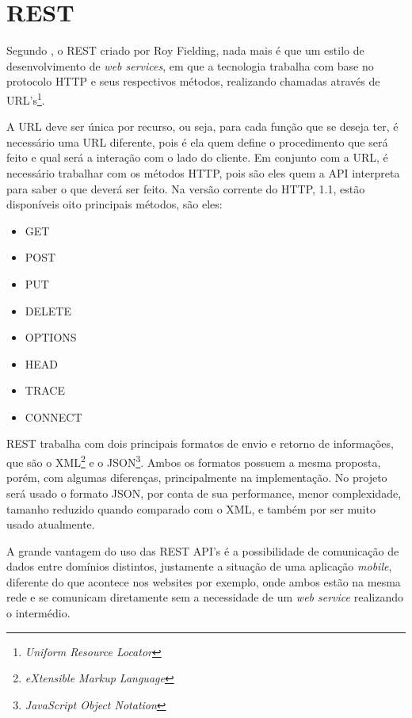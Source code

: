 \section{REST}
	\par Segundo , o REST criado por Roy Fielding, nada mais é que um estilo de desenvolvimento de \textit{web services}, em que a tecnologia trabalha com base no protocolo HTTP e seus respectivos métodos, realizando chamadas através de URL's\footnote{\textit{Uniform Resource Locator}}. 
	\par A URL deve ser única por recurso, ou seja, para cada função que se deseja ter, é necessário uma URL diferente, pois é ela quem define o procedimento que será feito e qual será a interação com o lado do cliente. Em conjunto com a URL, é necessário trabalhar com os métodos HTTP, pois são eles quem a API interpreta para saber o que deverá ser feito. Na versão corrente do HTTP, 1.1, estão disponíveis oito principais métodos, são eles:
	\begin{itemize}
	 	\item GET
	 	\item POST
	 	\item PUT
	 	\item DELETE
	 	\item OPTIONS
	 	\item HEAD
	 	\item TRACE
	   	\item CONNECT
	\end{itemize}
	\par REST trabalha com dois principais formatos de envio e retorno de informações, que são o XML\footnote{\textit{eXtensible Markup Language}} e o JSON\footnote{\textit{JavaScript Object Notation}}. Ambos os formatos possuem a mesma proposta, porém, com algumas diferenças, principalmente na implementação. No projeto será usado o formato JSON, por conta de sua performance, menor complexidade, tamanho reduzido quando comparado com o XML, e também por ser muito usado atualmente.
	\par A grande vantagem do uso das REST API's é a possibilidade de comunicação de dados entre domínios distintos, justamente a situação de uma aplicação \textit{mobile}, diferente do que acontece nos websites por exemplo, onde ambos estão na mesma rede e se comunicam diretamente sem a necessidade de um \textit{web service} realizando o intermédio.

